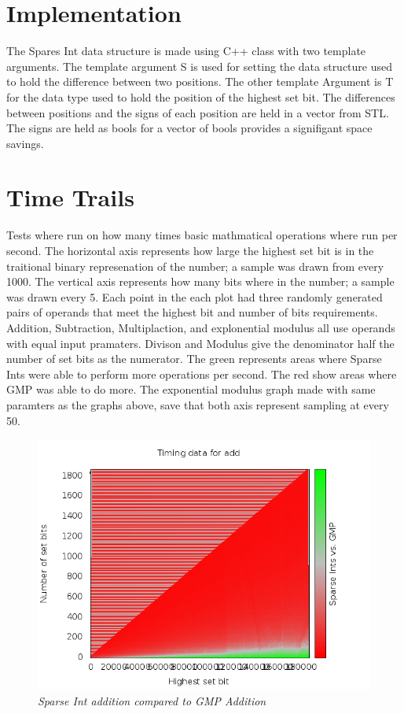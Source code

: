 \documentclass[letterpaper,11pt]{article}
\begin{document}
\section{Implementation} The Spares Int data structure is made using
C++ class with two template arguments.  The template argument S is used
for setting the data structure used to hold the difference between two
positions. The other template Argument is T for the data type used to
hold the position of the highest set bit. The differences between
positions and the signs of each position are held in a vector from STL.
The signs are held as bools for a vector of bools provides a signifigant
space savings. 

\section{Time Trails} Tests where run on how many times basic
mathmatical operations where run per second.  The horizontal axis
represents how large the highest set bit is in the traitional binary
represenation of the number; a sample was drawn from every 1000.  The
vertical axis represents how many bits where in the number; a sample was
drawn every 5.  Each point in the each plot had three randomly generated
pairs of operands that meet the highest bit and number of bits
requirements. Addition, Subtraction, Multiplaction, and explonential
modulus all use operands with equal input pramaters. Divison and Modulus
give the denominator half the number of set bits as the numerator.  The
green represents areas where Sparse Ints were able to perform more
operations per second.  The red show areas where GMP was able to do
more.
The exponential modulus graph made with same paramters as the graphs above, save that both axis 
represent sampling at every 50.



\begin{figure}  
\begin{center}  
\includegraphics[width=.8\textwidth]{../plots/add5num1000high3test.png}  
\caption{\small \sl Sparse Int addition compared to GMP Addition\label{fig:Addition}}  
\end{center}  
\end{figure} 
\end{document}
